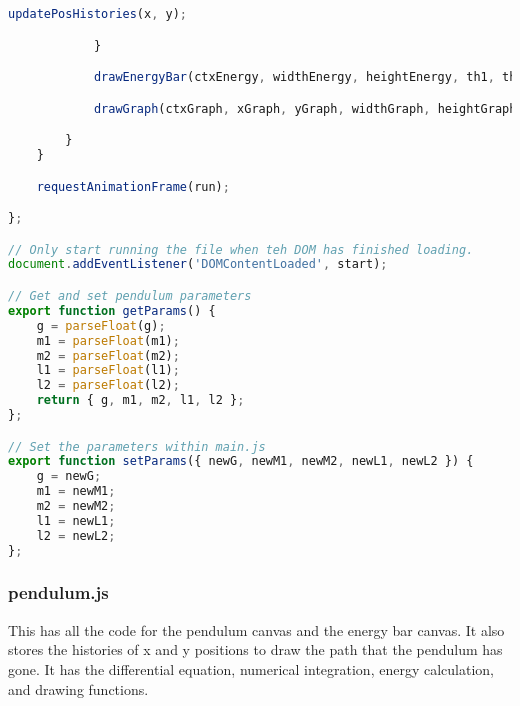 \documentclass[12pt]{article}
\begin{document}
\begin{lstlisting}[language=JavaScript]
                updatePosHistories(x, y);

            }

            drawEnergyBar(ctxEnergy, widthEnergy, heightEnergy, th1, th2, om1, om2, maxLabel);

            drawGraph(ctxGraph, xGraph, yGraph, widthGraph, heightGraph, pauseCheck);

        }
    }

    requestAnimationFrame(run);

};

// Only start running the file when teh DOM has finished loading.
document.addEventListener('DOMContentLoaded', start);

// Get and set pendulum parameters
export function getParams() {
    g = parseFloat(g);
    m1 = parseFloat(m1);
    m2 = parseFloat(m2);
    l1 = parseFloat(l1);
    l2 = parseFloat(l2);
    return { g, m1, m2, l1, l2 };
};

// Set the parameters within main.js
export function setParams({ newG, newM1, newM2, newL1, newL2 }) {
    g = newG;
    m1 = newM1;
    m2 = newM2;
    l1 = newL1;
    l2 = newL2;
};
\end{lstlisting}



\subsubsection{pendulum.js}
This has all the code for the pendulum canvas and the energy bar canvas. It also stores the histories of x and y positions to draw the path that the pendulum has gone. It has the differential equation, numerical integration, energy calculation, and drawing functions.
\end{document}
